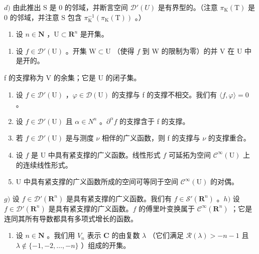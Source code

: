 \(d)\) 由此推出 S 是 0 的邻域，并断言空间 \(\mathcal{D}'(U)\) 是有界型的。（注意 \(\pi_{\mathrm{K}}(\mathrm{T})\) 是 0 的邻域，并注意 S 包含 \(\pi_{\mathrm{K}}^{-1}(\pi_{\mathrm{K}}(\mathrm{T}))\) 。）

\begin{enumerate}
\def\labelenumi{\arabic{enumi})}
\setcounter{enumi}{18}
\tightlist
\item
  设 \(n \in \mathbf{N}\) ，\(\mathrm{U} \subset \mathbf{R}^n\) 是开集。
\end{enumerate}

\begin{enumerate}
\def\labelenumi{\alph{enumi})}
\tightlist
\item
  设 \(f \in \mathcal{D}'(\mathrm{U})\) 。开集 \(\mathrm{W} \subset \mathrm{U}\) （使得 \(f\) 到 W 的限制为零）的并 V 在 U 中是开的。
\end{enumerate}

f 的支撑称为 V 的余集；它是 U 的闭子集。

\begin{enumerate}
\def\labelenumi{\alph{enumi})}
\setcounter{enumi}{1}
\item
  设 \(f \in \mathcal{D}'(\mathrm{U})\) ，\(\varphi \in \mathcal{D}(\mathrm{U})\) 的支撑与 f 的支撑不相交。我们有 \(\langle f, \varphi \rangle = 0\) 。
\item
  设 \(f \in \mathcal{D}'(\mathrm{U})\) 且 \(\alpha \in N^{n}\) 。\(\partial^{\alpha}f\) 的支撑含于 f 的支撑。
\item
  若 \(f \in \mathcal{D}'(\mathrm{U})\) 是与测度 \(\nu\) 相伴的广义函数，则 f 的支撑与 \(\nu\) 的支撑重合。
\item
  设 \(f\) 是 U 中具有紧支撑的广义函数。线性形式 \(f\) 可延拓为空间 \(\mathcal{C}^{\infty}(\mathrm{U})\) 上的连续线性形式。
\item
  U 中具有紧支撑的广义函数所成的空间可等同于空间 \(\mathcal{C}^{\infty}(\mathrm{U})\) 的对偶。
\end{enumerate}

\(g)\) 设 \(f \in \mathcal{D}'(\mathbf{R}^n)\) 是具有紧支撑的广义函数。我们有 \(f \in \mathcal{S}'(\mathbf{R}^n)\) 。\(h)\) 设 \(f \in \mathcal{D}'(\mathbf{R}^n)\) 是具有紧支撑的广义函数。\(f\) 的傅里叶变换属于 \(\mathcal{C}^\infty(\mathbf{R}^n)\) ；它是连同其所有导数都具有多项式增长的函数。

\begin{enumerate}
\def\labelenumi{\arabic{enumi})}
\setcounter{enumi}{19}
\tightlist
\item
  设 \(n \in \mathbf{N}\) 。我们用 \(V_n\) 表示 \(\mathbf{C}\) 的由复数 \(\lambda\) （它们满足 \(\mathcal{R}(\lambda) > -n - 1\) 且 \(\lambda \notin \{-1, -2, \ldots, -n\}\) ）组成的开集。
\end{enumerate}

